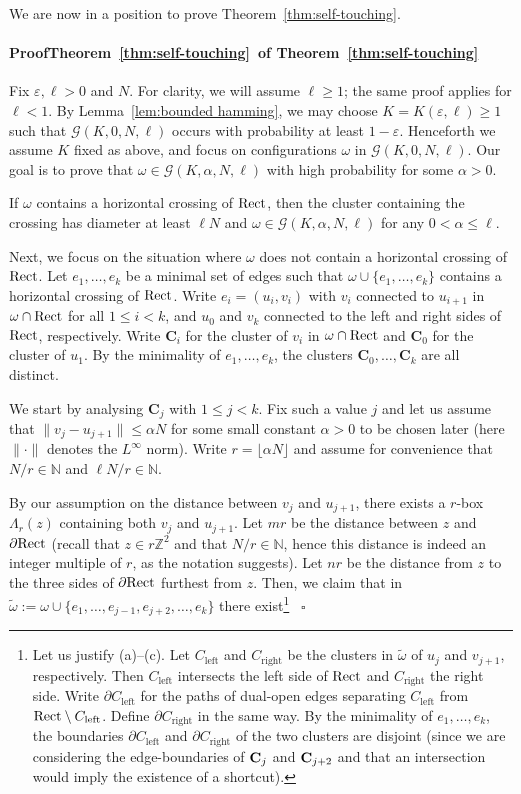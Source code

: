 \documentclass[a4paper,oneside,11pt]{article}
\numberwithin{equation}{section}
\numberwithin{equation}{section}
\numberwithin{equation}{section}
\newenvironment{proof}[1][\relax]%
  {\paragraph{Proof\ifx#1\relax\else~of #1\fi}}%
  {~\hfill$\square$\par\bigskip}
\newcommand{\calG}{\mathcal{G}}
\newcommand{\bbN}{\mathbb{N}}
\newcommand{\bbZ}{\mathbb{Z}}
\newcommand{\bfC}{\mathbf C}
\newcommand{\eps}{\varepsilon}
\newcommand{\La}{\Lambda}
\begin{document}
We are now in a position to prove Theorem~\ref{thm:self-touching}.
\begin{proof}[Theorem~\ref{thm:self-touching}]
	Fix $\eps,\ell > 0$ and $N$. For clarity, we will assume $\ell \geq 1$; the same proof applies for $\ell <1$. 
	By Lemma~\ref{lem:bounded hamming}, we may choose $K = K(\eps,\ell) \geq 1$ such that
	$\calG(K,0,N,\ell)$ occurs with probability at least $1 - \eps$.
	Henceforth we assume $K$ fixed as above, and focus on configurations $\omega$ in $\calG(K,0,N,\ell)$.
	Our goal is to prove that $\omega \in \calG(K,\alpha,N,\ell)$ with high probability for some $\alpha >0$. 
	
	If $\omega$ contains a horizontal crossing of ${\rm Rect}$, then the cluster containing the crossing has diameter at least $\ell N$ 
	and $\omega\in \calG(K,\alpha,N,\ell)$ for any $0 < \alpha \leq \ell$. 
	
	Next, we focus on the situation where $\omega$ does not contain a horizontal crossing of ${\rm Rect}$. 
	Let $e_1,\dots, e_k$ be a minimal set of edges such that $\omega\cup\{e_1,\dots, e_k\}$ contains a horizontal crossing of ${\rm Rect}$.
	Write $e_i = (u_i,v_i)$ with $v_i$ connected to $u_{i+1}$ in $\omega \cap {\rm Rect}$ for all $1 \leq i < k$, 
	and $u_0$ and $v_k$ connected to the left and right sides of ${\rm Rect}$, respectively. 
	Write $\bfC_i$ for the cluster of $v_i$ in $\omega \cap {\rm Rect}$ and $\bfC_{0}$ for the cluster of $u_1$.
	By the minimality of $e_1,\dots, e_k$, the clusters $\bfC_0,\dots, \bfC_k$ are all distinct. 
	
	We start by analysing $\bfC_j$ with $1 \leq j < k$. 
	Fix such a value $j$ and let us assume that $\|v_j - u_{j+1}\| \leq \alpha N$ for some small constant $\alpha >0$ to be chosen later
	(here $\|\cdot\|$ denotes the $L^\infty$ norm). 
	Write $r = \lfloor \alpha N \rfloor$ and assume for convenience that $N /r \in \bbN$ and $\ell N /r \in \bbN$.
	
	By our assumption on the distance between $v_j$ and $u_{j+1}$, there exists a $r$-box $\La_r(z)$ containing both $v_j$ and $u_{j+1}$. 
	Let $m r$ be the distance between $z$ and $\partial {\rm Rect}$ 
	(recall that $z \in r\bbZ^2$ and that $N/r \in \bbN$, hence this distance is indeed an integer multiple of $r$, as the notation suggests). 
	Let $n r$ be the distance from $z$ to the three sides of $\partial {\rm Rect}$ furthest from $z$. 
	Then, we claim that in $\tilde\omega:=\omega\cup\{e_1,\dots, e_{j-1}, e_{j+2}, \dots, e_k\}$ there exist\footnote{
		Let us justify (a)--(c).
    	Let $C_{\text{left}}$ and $C_{\text{right}}$ be the clusters in $\tilde\omega$ of $u_{j}$ and $v_{j+1}$, respectively.
    	Then $C_{\text{left}}$ intersects the left side of ${\rm Rect}$ and $C_{\text{right}}$ the right side. 
    	Write $\partial C_{\text{left}}$ for the paths of dual-open edges separating  $C_{\text{left}}$ from ${\rm Rect} \setminus  C_{\text{left}}$.
    	Define $\partial C_{\text{right}}$ in the same way. 
    	By the minimality of $e_1,\dots, e_k$, the boundaries $\partial C_{\text{left}}$ and $\partial C_{\text{right}}$ of the two clusters are disjoint 
		(since we are considering the edge-boundaries of ${\bf C}_j$ and ${\bf C}_{j+2}$ and that an intersection would imply the existence of a shortcut). 
    	
}
\end{proof}
\end{document}

